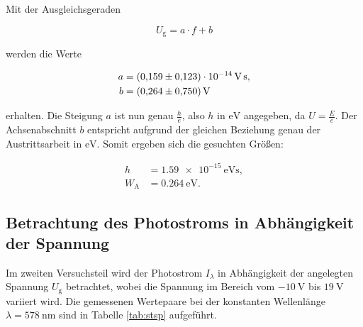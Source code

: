 Mit der Ausgleichsgeraden

\begin{equation*}
U_\text{g} = a\cdot f + b
\end{equation*}

werden die Werte

\begin{align*}
a &= \SI{0.159+-0.123e-14}{\volt\second},\\
b &= \SI{0.264+-0.750}{\volt}
\end{align*}

erhalten.
Die Steigung $a$ ist nun genau $\frac{h}{e}$, also $h$ in $\si{\eV}$ angegeben, da $U = \frac{E}{e}$. Der 
Achsenabschnitt $b$ entspricht aufgrund der gleichen Beziehung genau der Austrittsarbeit in $\si{\eV}$.
Somit ergeben sich die gesuchten Größen: 

\begin{align*}
h &= \SI{1.59e-15}{\eV\second},\\
W_\text{A} &= \SI{0.264}{\eV}.
\end{align*}

\subsection{Betrachtung des Photostroms in Abhängigkeit der Spannung}

Im zweiten Versuchsteil wird der Photostrom $I_\lambda$ in Abhängigkeit der angelegten Spannung $U_\text{g}$
betrachtet, wobei die Spannung im Bereich vom $\SI{-10}{\volt}$ bis $\SI{19}{\volt}$ variiert 
wird. Die gemessenen Wertepaare bei der konstanten Wellenlänge $\lambda = \SI{578}{\nano\meter}$
sind in Tabelle \ref{tab:stsp} aufgeführt. 

